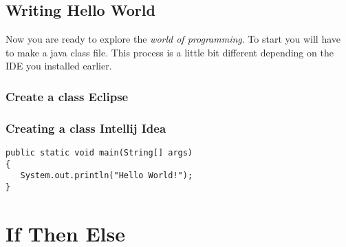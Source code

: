 \documentclass{article}
\begin{document}
\subsection{Writing Hello World}
Now you are ready to explore the \emph{world of programming}. To start you will have
to make a java class file. This process is a little bit different depending on the IDE you installed earlier.

\subsubsection{Create a class Eclipse}



\subsubsection{Creating a class Intellij Idea}

\begin{lstlisting}
public static void main(String[] args)
{
   System.out.println("Hello World!");
}
\end{lstlisting}

\section{If Then Else}
\end{document}

